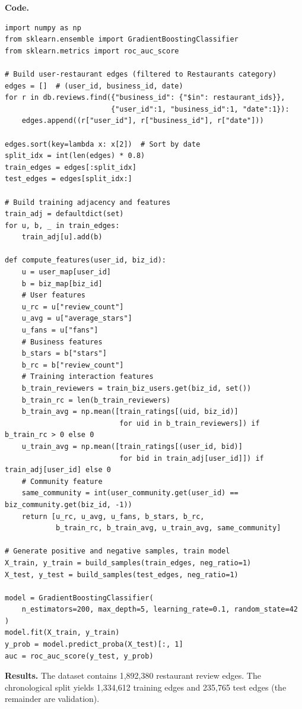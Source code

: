 \documentclass[11pt]{article}
\begin{document}
\textbf{Code.}
\begin{lstlisting}[style=python, caption={Link prediction model for restaurant recommendation.}, label={lst:gds-q5}]
import numpy as np
from sklearn.ensemble import GradientBoostingClassifier
from sklearn.metrics import roc_auc_score

# Build user-restaurant edges (filtered to Restaurants category)
edges = []  # (user_id, business_id, date)
for r in db.reviews.find({"business_id": {"$in": restaurant_ids}},
                         {"user_id":1, "business_id":1, "date":1}):
    edges.append((r["user_id"], r["business_id"], r["date"]))

edges.sort(key=lambda x: x[2])  # Sort by date
split_idx = int(len(edges) * 0.8)
train_edges = edges[:split_idx]
test_edges = edges[split_idx:]

# Build training adjacency and features
train_adj = defaultdict(set)
for u, b, _ in train_edges:
    train_adj[u].add(b)

def compute_features(user_id, biz_id):
    u = user_map[user_id]
    b = biz_map[biz_id]
    # User features
    u_rc = u["review_count"]
    u_avg = u["average_stars"]
    u_fans = u["fans"]
    # Business features
    b_stars = b["stars"]
    b_rc = b["review_count"]
    # Training interaction features
    b_train_reviewers = train_biz_users.get(biz_id, set())
    b_train_rc = len(b_train_reviewers)
    b_train_avg = np.mean([train_ratings[(uid, biz_id)]
                           for uid in b_train_reviewers]) if b_train_rc > 0 else 0
    u_train_avg = np.mean([train_ratings[(user_id, bid)]
                           for bid in train_adj[user_id]]) if train_adj[user_id] else 0
    # Community feature
    same_community = int(user_community.get(user_id) == biz_community.get(biz_id, -1))
    return [u_rc, u_avg, u_fans, b_stars, b_rc,
            b_train_rc, b_train_avg, u_train_avg, same_community]

# Generate positive and negative samples, train model
X_train, y_train = build_samples(train_edges, neg_ratio=1)
X_test, y_test = build_samples(test_edges, neg_ratio=1)

model = GradientBoostingClassifier(
    n_estimators=200, max_depth=5, learning_rate=0.1, random_state=42
)
model.fit(X_train, y_train)
y_prob = model.predict_proba(X_test)[:, 1]
auc = roc_auc_score(y_test, y_prob)
\end{lstlisting}

\textbf{Results.} The dataset contains 1,892,380 restaurant review edges. The chronological split yields 1,334,612 training edges and 235,765 test edges (the remainder are validation).
\end{document}
